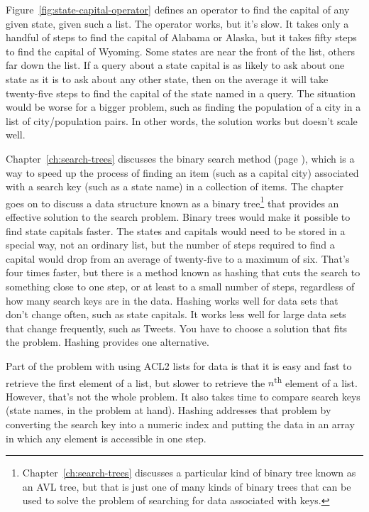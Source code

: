 Figure~\ref{fig:state-capital-operator}
defines an operator to find the
capital of any given state, given such a list.
The operator works, but it's slow.
It takes only a handful of steps to find the capital of Alabama or
Alaska, but it takes fifty steps to find the capital of Wyoming.
Some states are near the front of the list,
others far down the list.
If a query about a state capital is as likely to ask about
one state as it is to ask about any other state,
then on the average it will take twenty-five steps to find
the capital of the state named in a query.
The situation would be worse for a bigger problem,
such as finding the population of a city in a list of city/population pairs.
In other words, the solution works but doesn't scale well.

Chapter~\ref{ch:search-trees} discusses the binary search
method (page \pageref{binary-search-method}),
which is a way to speed up the process of finding an item
(such as a capital city)
associated with a search key (such as a state name) in a
collection of items. The chapter goes on to discuss
a data structure known as a
binary tree\footnote{Chapter~\ref{ch:search-trees}
discusses a particular kind of binary tree known as an AVL tree,
but that is just one of many kinds of binary trees
that can be used to solve the problem of searching
for data associated with keys.}
that provides an effective solution to the search problem.
Binary trees would make it possible to find
state capitals faster. The states and capitals would need to be stored
in a special way, not an ordinary list,
but the number of steps required to find a capital
would drop from an average of twenty-five to a maximum of six.
That's four times faster, but there is a method known as hashing
that cuts the search to something close to one step, or at least
to a small number of steps, regardless of how
many search keys are in the data.
Hashing works well for data sets that don't change often,
such as state capitals. It works less well for large
data sets that change frequently, such as Tweets.
You have to choose a solution that fits the problem.
Hashing provides one alternative.

Part of the problem with using ACL2 lists
for data is that it is easy and fast to retrieve the
first element of a list, but slower to retrieve the
$n$\textsuperscript{th} element of a list.
However, that's not the whole problem.
It also takes time to compare search keys
(state names, in the problem at hand).
Hashing addresses that problem by converting the search key
into a numeric index and putting the data
in an array in which any element is accessible 
in one step.

